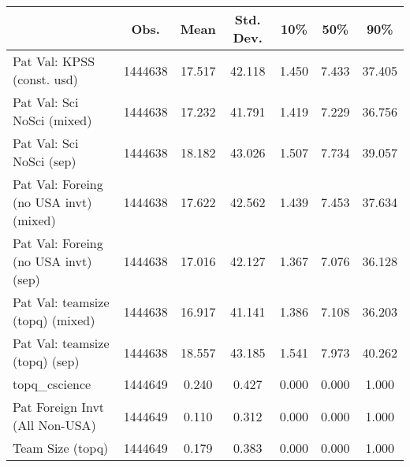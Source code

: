 {
\def\sym#1{\ifmmode^{#1}\else\(^{#1}\)\fi}
\begin{tabular}{l*{1}{cccccc}}
\hline\hline
                    &        Obs.&        Mean&   Std. Dev.&        10\%&        50\%&        90\%\\
\hline
Pat Val: KPSS (const. usd)&     1444638&      17.517&      42.118&       1.450&       7.433&      37.405\\
Pat Val: Sci NoSci (mixed)&     1444638&      17.232&      41.791&       1.419&       7.229&      36.756\\
Pat Val: Sci NoSci (sep)&     1444638&      18.182&      43.026&       1.507&       7.734&      39.057\\
Pat Val: Foreing (no USA invt) (mixed)&     1444638&      17.622&      42.562&       1.439&       7.453&      37.634\\
Pat Val: Foreing (no USA invt) (sep)&     1444638&      17.016&      42.127&       1.367&       7.076&      36.128\\
Pat Val: teamsize (topq) (mixed)&     1444638&      16.917&      41.141&       1.386&       7.108&      36.203\\
Pat Val: teamsize (topq) (sep)&     1444638&      18.557&      43.185&       1.541&       7.973&      40.262\\
topq\_cscience       &     1444649&       0.240&       0.427&       0.000&       0.000&       1.000\\
Pat Foreign Invt (All Non-USA)&     1444649&       0.110&       0.312&       0.000&       0.000&       1.000\\
Team Size (topq)    &     1444649&       0.179&       0.383&       0.000&       0.000&       1.000\\
\hline\hline
\end{tabular}
}
